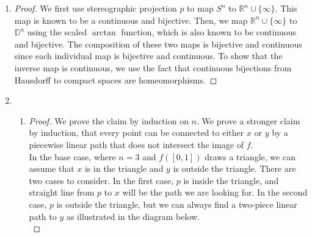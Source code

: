 \documentclass{article}
\begin{document}
\begin{enumerate}
\begin{enumerate}
\begin{proof}
          Consider the distinct points $[(-1,0)]$ and $[(1,0)]$ in
          $X/\sim$. Let $\bar{U}$ and $\bar{V}$ be open sets covering the
          distinct points respectively. Without loss of generality, we can
          assume that the inverse quotient image $U=\pi^{-1}(\bar(U))$ and
          $V=\pi^{-1}(\bar(V))$ of these open sets include the balls
          $B_{r}((-1,0))$ and $B_{r_2}((-1,0))$ respectively, where $r<1$.
          Hence, $U$ and $V$ include the points $(-1+r/2,0)$ and $(1-r/2,0)$
          respectively. However, these two points belong to the same
          equivalence class and are therefore the same point in the
          quotient space, which implies that $\bar{U}$ and $\bar{V}$ cannot
          be disjoint in the quotient space.
        \end{proof}
    \end{enumerate}
  \item
    \begin{proof}
      We first use stereographic projection $p$ to map $S^n$ to
      $\mathbb{R}^n\cup\{\infty\}$. This map is known to be a continuous
      and bijective. Then, we map $\mathbb{R}^n\cup\{\infty\}$ to
      $\mathbb{D}^n$ using the scaled $\arctan$ function, which is also
      known to be continuous and bijective. The composition of these two
      maps is bijective and continuous since each individual map is
      bijective and continuous. To show that the inverse map is continuous,
      we use the fact that continuous bijections from Hausdorff to compact
      spaces are homeomorphisms.
    \end{proof}
  \item
    \begin{enumerate}
      \item
        \begin{proof}
          We prove the claim by induction on $n$. We prove a stronger
          claim by induction, that every point can be connected to either
          $x$ or $y$ by a piecewise linear path that does not intersect the
          image of $f$. \\

          In the base case, where $n=3$ and $f([0,1])$ draws a triangle, we
          can assume that $x$ is in the triangle and $y$ is outside the
          triangle. There are two cases to consider. In the first case, $p$
          is inside the triangle, and straight line from $p$ to $x$ will be
          the path we are looking for. In the second case, $p$ is outside
          the triangle, but we can always find a two-piece linear path to
          $y$ as illustrated in the diagram below. \\


\end{proof}
\end{enumerate}
\end{enumerate}
\end{document}
